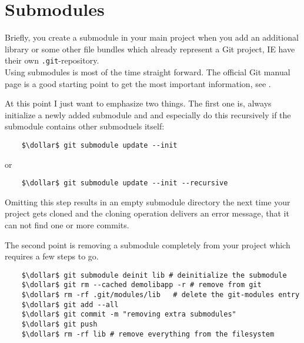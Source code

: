 \section{Submodules}
\label{chapter:Miscellaneous.3}

Briefly, you create a submodule in your main project when you add an additional library or some other file 
bundles which already represent a Git project, \ac{IE} have their own \verb|.git|-repository.
\\
Using submodules is most of the time straight forward. The official Git manual page is a good starting point 
to get the most important information, see \cite{Unknown2021Git-Tools-Submodule}.

At this point I just want to emphasize two things. The first one is, always initialize a newly added submodule
and and especially do this recursively if the submodule contains other submoduels itself:
\begin{lstlisting}
	$\dollar$ git submodule update --init
\end{lstlisting}  
or
\begin{lstlisting}
	$\dollar$ git submodule update --init --recursive
\end{lstlisting}
Omitting this step results in an empty submodule directory the next time your project gets cloned and the 
cloning operation delivers an error message, that it can not find one or more commits.

The second point is removing a submodule completely from your project which requires a few steps to go.

\begin{lstlisting}
	$\dollar$ git submodule deinit lib # deinitialize the submodule
	$\dollar$ git rm --cached demolibapp -r # remove from git
	$\dollar$ rm -rf .git/modules/lib	# delete the git-modules entry
	$\dollar$ git add --all
	$\dollar$ git commit -m "removing extra submodules"
	$\dollar$ git push
	$\dollar$ rm -rf lib # remove everything from the filesystem	
\end{lstlisting}





